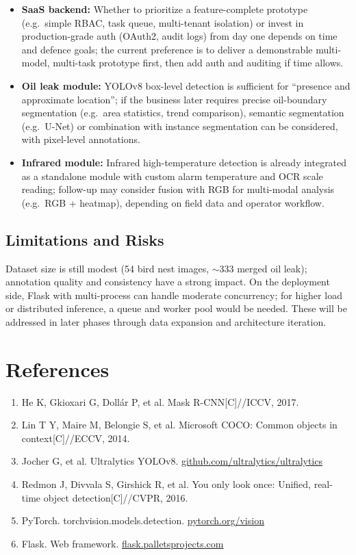 \documentclass[12pt,a4paper]{article}
\begin{document}
\begin{itemize}
  \item \textbf{SaaS backend:} Whether to prioritize a feature-complete prototype (e.g.\ simple RBAC, task queue, multi-tenant isolation) or invest in production-grade auth (OAuth2, audit logs) from day one depends on time and defence goals; the current preference is to deliver a demonstrable multi-model, multi-task prototype first, then add auth and auditing if time allows.
  \item \textbf{Oil leak module:} YOLOv8 box-level detection is sufficient for ``presence and approximate location''; if the business later requires precise oil-boundary segmentation (e.g.\ area statistics, trend comparison), semantic segmentation (e.g.\ U-Net) or combination with instance segmentation can be considered, with pixel-level annotations.
  \item \textbf{Infrared module:} Infrared high-temperature detection is already integrated as a standalone module with custom alarm temperature and OCR scale reading; follow-up may consider fusion with RGB for multi-modal analysis (e.g.\ RGB + heatmap), depending on field data and operator workflow.
\end{itemize}

\subsection{Limitations and Risks}

Dataset size is still modest (54 bird nest images, $\sim$333 merged oil leak); annotation quality and consistency have a strong impact. On the deployment side, Flask with multi-process can handle moderate concurrency; for higher load or distributed inference, a queue and worker pool would be needed. These will be addressed in later phases through data expansion and architecture iteration.

\section{References}

\begin{enumerate}
  \item He K, Gkioxari G, Dollár P, et al. Mask R-CNN[C]//ICCV, 2017.
  \item Lin T Y, Maire M, Belongie S, et al. Microsoft COCO: Common objects in context[C]//ECCV, 2014.
  \item Jocher G, et al. Ultralytics YOLOv8. \href{https://github.com/ultralytics/ultralytics}{github.com/ultralytics/ultralytics}
  \item Redmon J, Divvala S, Girshick R, et al. You only look once: Unified, real-time object detection[C]//CVPR, 2016.
  \item PyTorch. torchvision.models.detection. \href{https://pytorch.org/vision/stable/models.html}{pytorch.org/vision}
  \item Flask. Web framework. \href{https://flask.palletsprojects.com/}{flask.palletsprojects.com}
\end{enumerate}
\end{document}
